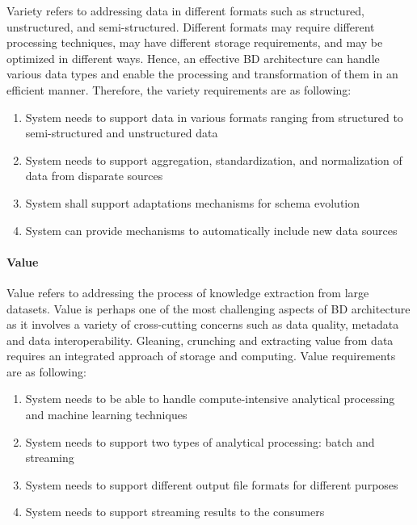 \documentclass{bmcart}
\begin{document}
Variety refers to addressing data in different formats such as structured, unstructured, and semi-structured. Different formats may require different processing techniques, may have different storage requirements, and may be optimized in different ways. Hence, an effective BD architecture can handle various data types and enable the processing and transformation of them in an efficient manner. Therefore, the variety requirements are as following: 

\begin{enumerate}[label=\textbf{Var-\arabic*}]
    \item System needs to support data in various formats ranging from structured to semi-structured and unstructured data
    \item System needs to support aggregation, standardization, and normalization of data from disparate sources
    \item System shall support adaptations mechanisms for schema evolution
    \item System can provide mechanisms to automatically include new data sources
\end{enumerate}


\paragraph{Value}

Value refers to addressing the process of knowledge extraction from large datasets. Value is perhaps one of the most challenging aspects of BD architecture as it involves a variety of cross-cutting concerns such as data quality, metadata and data interoperability. Gleaning, crunching and extracting value from data requires an integrated approach of storage and computing. Value requirements are as following:

\begin{enumerate}[label=\textbf{Val-\arabic*}]
    \item System needs to be able to handle compute-intensive analytical processing and machine learning techniques
    \item System needs to support two types of analytical processing: batch and streaming
    \item System needs to support different output file formats for different purposes
    \item System needs to support streaming results to the consumers 
\end{enumerate}
\end{document}
